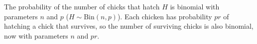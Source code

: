 
\setcounter{theorem}{27}

\begin{exercise}[BH.3.28]
\begin{solution}
	The probability of the number of chicks that hatch $H$ is binomial with parameters $n$ and $p$ ($H\sim \text{Bin}(n,p)$). Each chicken has probability $pr$ of hatching a chick that survives, so the number of surviving chicks is also binomial, now with parameters $n$ and $pr$.
\end{solution}
\end{exercise}


